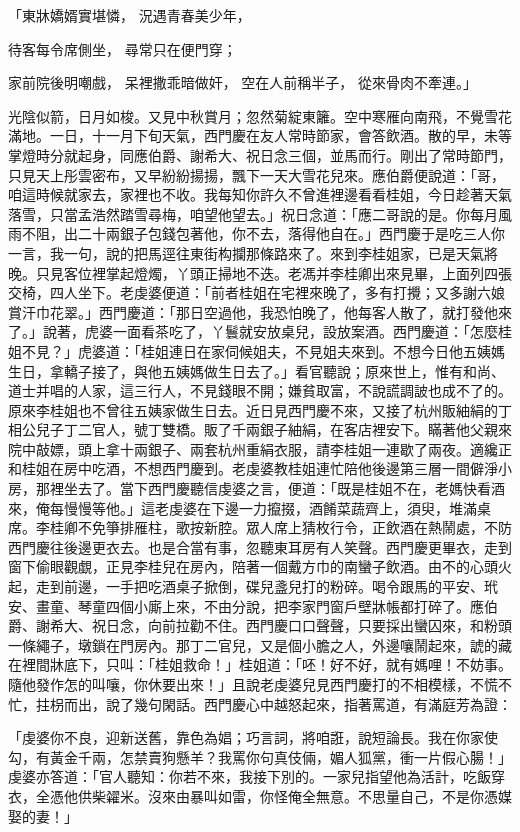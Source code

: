 \begin{showcontents}{}
「東牀嬌婿實堪憐，  況遇青春美少年，

待客每令席側坐，  尋常只在便門穿；

家前院後明嘲戲，  呆裡撒乖暗做奸，     空在人前稱半子，  從來骨肉不牽連。」

光陰似箭，日月如梭。又見中秋賞月；忽然菊綻東籬。空中寒雁向南飛，不覺雪花滿地。一日，十一月下旬天氣，西門慶在友人常時節家，會答飲酒。散的早，未等掌燈時分就起身，同應伯爵、謝希大、祝日念三個，並馬而行。剛出了常時節門，只見天上彤雲密布，又早紛紛揚揚，飄下一天大雪花兒來。應伯爵便說道：「哥，咱這時候就家去，家裡也不收。我每知你許久不曾進裡邊看看桂姐，今日趁著天氣落雪，只當孟浩然踏雪尋梅，咱望他望去。」祝日念道：「應二哥說的是。你每月風雨不阻，出二十兩銀子包錢包著他，你不去，落得他自在。」西門慶于是吃三人你一言，我一句，說的把馬逕往東街构攔那條路來了。來到李桂姐家，已是天氣將晚。只見客位裡掌起燈燭，丫頭正掃地不迭。老馮并李桂卿出來見畢，上面列四張交椅，四人坐下。老虔婆便道：「前者桂姐在宅裡來晚了，多有打攪；又多謝六娘賞汗巾花翠。」西門慶道：「那日空過他，我恐怕晚了，他每客人散了，就打發他來了。」說著，虎婆一面看茶吃了，丫鬟就安放桌兒，設放案酒。西門慶道：「怎麼桂姐不見？」虎婆道：「桂姐連日在家伺候姐夫，不見姐夫來到。不想今日他五姨媽生日，拿轎子接了，與他五姨媽做生日去了。」看官聽說；原來世上，惟有和尚、道士并唱的人家，這三行人，不見錢眼不開；嫌貧取富，不說謊調詖也成不了的。原來李桂姐也不曾往五姨家做生日去。近日見西門慶不來，又接了杭州販紬絹的丁相公兒子丁二官人，號丁雙橋。販了千兩銀子紬絹，在客店裡安下。瞞著他父親來院中敲嫖，頭上拿十兩銀子、兩套杭州重絹衣服，請李桂姐一連歇了兩夜。適纔正和桂姐在房中吃酒，不想西門慶到。老虔婆教桂姐連忙陪他後邊第三層一間僻淨小房，那裡坐去了。當下西門慶聽信虔婆之言，便道：「既是桂姐不在，老媽快看酒來，俺每慢慢等他。」這老虔婆在下邊一力攛掇，酒餚菜蔬齊上，須臾，堆滿桌席。李桂卿不免箏排雁柱，歌按新腔。眾人席上猜枚行令，正飲酒在熱鬧處，不防西門慶往後邊更衣去。也是合當有事，忽聽東耳房有人笑聲。西門慶更畢衣，走到窗下偷眼觀覷，正見李桂兒在房內，陪著一個戴方巾的南蠻子飲酒。由不的心頭火起，走到前邊，一手把吃酒桌子掀倒，碟兒盞兒打的粉碎。喝令跟馬的平安、玳安、畫童、琴童四個小廝上來，不由分說，把李家門窗戶壁牀帳都打碎了。應伯爵、謝希大、祝日念，向前拉勸不住。西門慶口口聲聲，只要採出蠻囚來，和粉頭一條繩子，墩鎖在門房內。那丁二官兒，又是個小膽之人，外邊嚷鬧起來，諕的藏在裡間牀底下，只叫：「桂姐救命！」桂姐道：「呸！好不好，就有媽哩！不妨事。隨他發作怎的叫嚷，你休要出來！」且說老虔婆兒見西門慶打的不相模樣，不慌不忙，拄枴而出，說了幾句閑話。西門慶心中越怒起來，指著罵道，有滿庭芳為證：

「虔婆你不良，迎新送舊，靠色為娼；巧言詞，將咱誑，說短論長。我在你家使勾，有黃金千兩，怎禁賣狗懸羊？我罵你句真伎倆，媚人狐黨，衝一片假心腸！」虔婆亦答道：「官人聽知：你若不來，我接下別的。一家兒指望他為活計，吃飯穿衣，全憑他供柴糴米。沒來由暴叫如雷，你怪俺全無意。不思量自己，不是你憑媒娶的妻！」


\end{showcontents}
